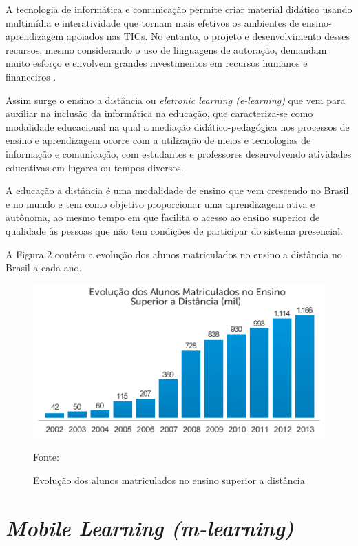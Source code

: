 \documentclass[
	12pt,				%
	openany,			%
	oneside,			%
	a4paper,			%
	english,			%
	french,				%
	spanish,			%
	brazil				%
	]{abntex2}
\begin{document}
	A tecnologia de informática e comunicação permite criar material didático usando multimídia e interatividade que tornam mais efetivos os ambientes de ensino-aprendizagem apoiados nas TICs. No entanto, o projeto e desenvolvimento desses recursos, mesmo considerando o uso de linguagens de autoração, demandam muito esforço e envolvem grandes investimentos em recursos humanos e financeiros \cite{TAROUCO}.



Assim surge o ensino a distância ou \textit{eletronic learning (e-learning)} que vem para auxiliar na inclusão da informática na educação, que caracteriza-se como modalidade educacional na qual a mediação didático-pedagógica nos processos de ensino e aprendizagem ocorre com a utilização de meios e tecnologias de informação e comunicação, com estudantes e professores desenvolvendo atividades educativas em lugares ou tempos diversos.

A educação a distância é uma modalidade de ensino que vem crescendo no Brasil e no mundo e tem como objetivo proporcionar uma aprendizagem ativa e autônoma, ao mesmo tempo em que facilita o acesso ao ensino superior de qualidade às pessoas que não tem condições de participar do sistema presencial.

	A Figura 2  contém a evolução dos alunos matriculados no ensino a distância no Brasil a cada ano.

\begin{figure}[!htb]
    \centering
\caption{Evolução dos alunos matriculados no ensino superior a distância}
\includegraphics[width=13cm]{figuras/ead.png}
\par
 Fonte: \cite{INEP}
\end{figure}

\section {\itshape Mobile Learning (m-learning)}
\end{document}
